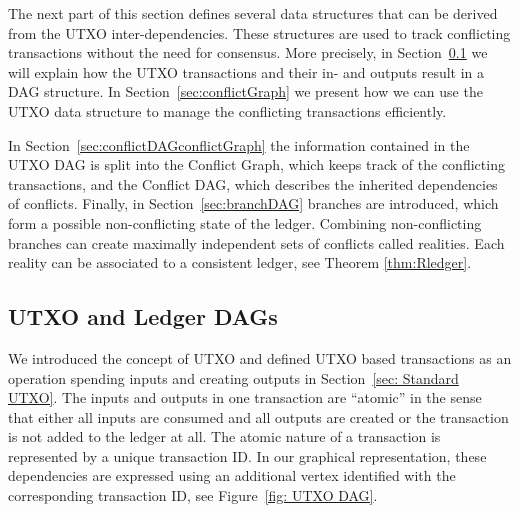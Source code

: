 \documentclass[11pt]{article}
\theoremstyle{plain}
\theoremstyle{definition}
\numberwithin{definition}{section}
\numberwithin{lemma}{section}
\numberwithin{ass}{section}
\numberwithin{remark}{section}
\numberwithin{example}{section}
\numberwithin{proposition}{section}
\numberwithin{theorem}{section}
\begin{document}
The next part of this section  defines several data structures that can be derived from the UTXO inter-dependencies. These structures are used to track conflicting transactions without the need for consensus. More precisely, in Section~\ref{sec: Standard UTXODAG} we will explain how the UTXO transactions and their in- and outputs result in a DAG structure. In Section~\ref{sec:conflictGraph} we present how we can use the UTXO data structure to manage the conflicting transactions efficiently. 

In Section~\ref{sec:conflictDAGconflictGraph} the information contained in the UTXO DAG is split into the Conflict Graph, which keeps track of the conflicting transactions, and the Conflict DAG, which describes the inherited dependencies of conflicts. Finally, in Section~\ref{sec:branchDAG} branches are introduced, which form a possible non-conflicting state of the ledger. Combining non-conflicting branches can create maximally independent sets of conflicts called realities. Each  reality can be associated to a consistent ledger, see Theorem \ref{thm:Rledger}. 



\subsection{UTXO and Ledger DAGs }\label{sec: Standard UTXODAG}
We introduced the concept of UTXO and defined UTXO based transactions as an operation spending inputs and creating outputs in Section~\ref{sec: Standard UTXO}.
The inputs and outputs in one transaction are ``atomic'' in the sense that either all inputs are consumed and all outputs are created or the transaction is not added to the ledger at all. The atomic nature of a transaction is represented by a unique transaction ID. In our graphical representation, these dependencies are expressed  using an additional vertex identified with the corresponding transaction ID, see Figure~\ref{fig: UTXO DAG}. 
\end{document}
